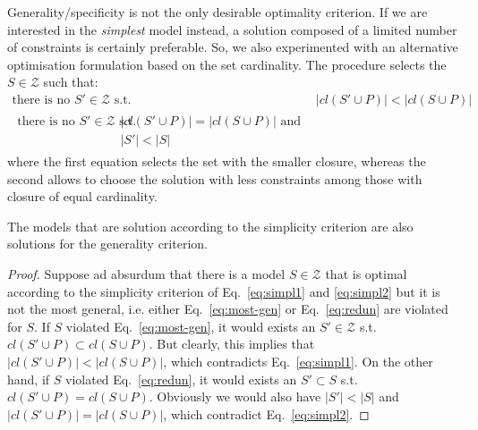 Generality/specificity is not the only desirable optimality criterion. If we are interested in the \emph{simplest} model instead, a solution composed of a limited number of constraints is certainly preferable. So, we also experimented with an alternative optimisation formulation based on the set cardinality. The procedure selects the $S \in\mathcal{Z}$ such that:
\begin{subequations}
   \begin{align}
    \text{there is no } S'\in\mathcal{Z} \text{ s.t. } & |cl(S'\cup P)| < |cl(S\cup P)| \label{eq:simpl1}\\
	\begin{split}
    \text{there is no } S'\in\mathcal{Z} \text{ s.t. } & |cl(S'\cup P)|=|cl(S\cup P)| \text{ and}\\
	&  |S'| < |S| \label{eq:simpl2} 
	\end{split}
   \end{align}
\end{subequations}
where the first equation selects the set with the smaller closure, whereas the second allows to choose the solution with less constraints among those with closure of equal cardinality.%


\theoremstyle{definition}\label{th:subset-generality}
\begin{theorem}{}
The models that are solution according to the simplicity criterion are also solutions for the generality criterion.
\end{theorem} 
\begin{proof}
Suppose ad absurdum that there is a model $S\in\mathcal{Z}$ that is optimal according to the simplicity criterion of Eq.~\eqref{eq:simpl1} and \eqref{eq:simpl2} but it is not the most general, i.e. either Eq.~\eqref{eq:most-gen} or Eq.~\eqref{eq:redun} are violated for $S$. If $S$ violated Eq.~\eqref{eq:most-gen}, it would exists an $S'\in\mathcal{Z}$ s.t. $cl(S'\cup P)\subset cl(S\cup P)$. But clearly, this implies that $|cl(S'\cup P)| < |cl(S\cup P)|$, which contradicts Eq.~\eqref{eq:simpl1}. On the other hand, if $S$ violated Eq.~\eqref{eq:redun}, it would exists an $S' \subset S$ s.t. $cl(S'\cup P)=cl(S\cup P)$. Obviously we would also have $|S'| < |S|$ and $|cl(S'\cup P)|=|cl(S\cup P)|$, which contradict Eq.~\eqref{eq:simpl2}. 
\end{proof}

